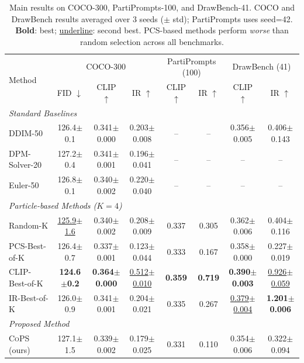 \documentclass{article}
\newcommand{\cops}{\textsc{CoPS}}
\newcommand{\pcs}{\textsc{PCS}}
\begin{document}
\begin{table}[t]
\centering
\caption{Main results on COCO-300, PartiPrompts-100, and DrawBench-41. COCO and DrawBench results averaged over 3 seeds ($\pm$ std); PartiPrompts uses seed=42. \textbf{Bold}: best; \underline{underline}: second best. \pcs{}-based methods perform \emph{worse} than random selection across all benchmarks.}
\label{tab:main_results}
\footnotesize
\setlength{\tabcolsep}{3pt}
\begin{tabular}{l|ccc|cc|cc}
\toprule
\multirow{2}{*}{Method} & \multicolumn{3}{c|}{COCO-300} & \multicolumn{2}{c|}{PartiPrompts (100)} & \multicolumn{2}{c}{DrawBench (41)} \\
& FID $\downarrow$ & CLIP $\uparrow$ & IR $\uparrow$ & CLIP $\uparrow$ & IR $\uparrow$ & CLIP $\uparrow$ & IR $\uparrow$ \\
\midrule
\multicolumn{8}{l}{\textit{Standard Baselines}} \\
DDIM-50 & 126.4$\pm$0.1 & 0.341$\pm$0.000 & 0.203$\pm$0.008 & -- & -- & 0.356$\pm$0.005 & 0.406$\pm$0.143 \\
DPM-Solver-20 & 127.2$\pm$0.4 & 0.341$\pm$0.001 & 0.196$\pm$0.041 & -- & -- & -- & -- \\
Euler-50 & 126.8$\pm$0.1 & 0.340$\pm$0.002 & 0.220$\pm$0.040 & -- & -- & -- & -- \\
\midrule
\multicolumn{8}{l}{\textit{Particle-based Methods ($K=4$)}} \\
Random-K & \underline{125.9$\pm$1.6} & 0.340$\pm$0.002 & 0.208$\pm$0.009 & 0.337 & 0.305 & 0.362$\pm$0.006 & 0.404$\pm$0.116 \\
PCS-Best-of-K & 126.4$\pm$0.7 & 0.337$\pm$0.001 & 0.123$\pm$0.044 & 0.333 & 0.167 & 0.358$\pm$0.000 & 0.227$\pm$0.019 \\
CLIP-Best-of-K & \textbf{124.6$\pm$0.2} & \textbf{0.364$\pm$0.000} & \underline{0.512$\pm$0.010} & \textbf{0.359} & \textbf{0.719} & \textbf{0.390$\pm$0.003} & \underline{0.926$\pm$0.059} \\
IR-Best-of-K & 126.0$\pm$0.9 & 0.341$\pm$0.001 & 0.204$\pm$0.021 & 0.335 & 0.267 & \underline{0.379$\pm$0.004} & \textbf{1.201$\pm$0.006} \\
\midrule
\multicolumn{8}{l}{\textit{Proposed Method}} \\
\cops{} (ours) & 127.1$\pm$1.5 & 0.339$\pm$0.002 & 0.179$\pm$0.025 & 0.331 & 0.110 & 0.354$\pm$0.006 & 0.322$\pm$0.094 \\
\bottomrule
\end{tabular}
\end{table}
\end{document}
